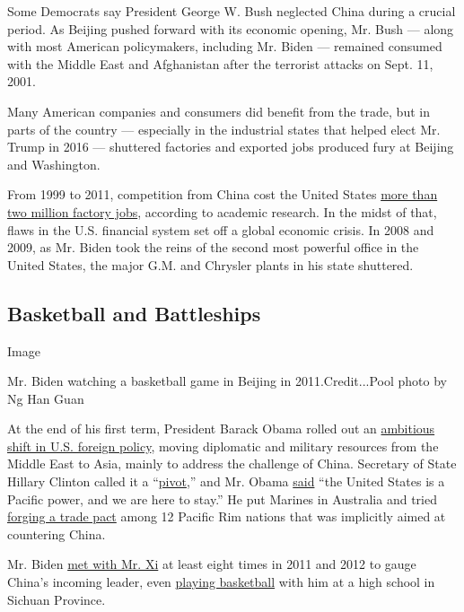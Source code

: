 Some Democrats say President George W. Bush neglected China during a
crucial period. As Beijing pushed forward with its economic opening, Mr.
Bush --- along with most American policymakers, including Mr. Biden ---
remained consumed with the Middle East and Afghanistan after the
terrorist attacks on Sept. 11, 2001.

Many American companies and consumers did benefit from the trade, but in
parts of the country --- especially in the industrial states that helped
elect Mr. Trump in 2016 --- shuttered factories and exported jobs
produced fury at Beijing and Washington.

From 1999 to 2011, competition from China cost the United States
\href{http://economics.mit.edu/files/11560}{more than two million
factory jobs}, according to academic research. In the midst of that,
flaws in the U.S. financial system set off a global economic crisis. In
2008 and 2009, as Mr. Biden took the reins of the second most powerful
office in the United States, the major G.M. and Chrysler plants in his
state shuttered.

\hypertarget{basketball-and-battleships}{%
\subsection{Basketball and
Battleships}\label{basketball-and-battleships}}

Image

Mr. Biden watching a basketball game in Beijing in 2011.Credit...Pool
photo by Ng Han Guan

At the end of his first term, President Barack Obama rolled out an
\href{https://www.nytimes3xbfgragh.onion/2011/11/16/world/asia/united-states-sees-china-everywhere-as-it-shifts-attention-to-asia.html}{ambitious
shift in U.S. foreign policy}, moving diplomatic and military resources
from the Middle East to Asia, mainly to address the challenge of China.
Secretary of State Hillary Clinton called it a
``\href{https://2009-2017.state.gov/secretary/20092013clinton/rm/2011/11/176999.htm}{pivot},''
and Mr. Obama
\href{https://www.theguardian.com/world/2011/nov/17/obama-asia-pacific-address-australia-parliament}{said}
``the United States is a Pacific power, and we are here to stay.'' He
put Marines in Australia and tried
\href{https://www.nytimes3xbfgragh.onion/2017/01/17/world/asia/china-tpp-ambassadors.html}{forging
a trade pact} among 12 Pacific Rim nations that was implicitly aimed at
countering China.

Mr. Biden
\href{https://www.nytimes3xbfgragh.onion/2012/02/18/world/asia/chinese-vice-president-xi-jinping-tours-los-angeles-port.html}{met
with Mr. Xi} at least eight times in 2011 and 2012 to gauge China's
incoming leader, even
\href{https://www.nytimes3xbfgragh.onion/2011/08/22/world/asia/22china.html}{playing
basketball} with him at a high school in Sichuan Province.

